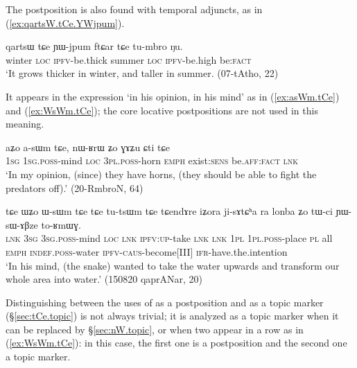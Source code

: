 The postposition  is also found with temporal adjuncts, as in (\ref{ex:qartsW.tCe.YWjpum}).

\begin{exe}
\ex \label{ex:qartsW.tCe.YWjpum}
\gll qartsɯ tɕe ɲɯ-jpum ftɕar tɕe tu-mbro ŋu. \\
winter \textsc{loc} \textsc{ipfv}-be.thick summer \textsc{loc} \textsc{ipfv}-be.high be:\textsc{fact} \\
\glt `It grows thicker in winter, and taller in summer. (07-tAtho, 22)
\end{exe}

It appears in the expression  `in his opinion, in his mind' as in (\ref{ex:asWm.tCe}) and (\ref{ex:WsWm.tCe}); the core locative postpositions are not used in this meaning.

\begin{exe}
\ex \label{ex:asWm.tCe}
\gll aʑo a-sɯm tɕe, nɯ-ʁrɯ ʑo ɣɤʑu ɕti tɕe \\
\textsc{1sg} \textsc{1sg}.\textsc{poss}-mind \textsc{loc} \textsc{3pl}.\textsc{poss}-horn \textsc{emph} exist:\textsc{sens} be.\textsc{aff}:\textsc{fact} \textsc{lnk} \\
\glt `In my opinion, (since) they have horns, (they should be able to fight the predators off).' (20-RmbroN, 64)
\end{exe}


\begin{exe}
\ex \label{ex:WsWm.tCe}
\gll tɕe ɯʑo ɯ-sɯm tɕe tɕe tu-tsɯm tɕe tɕendɤre iʑora ji-sɤtɕʰa ra lonba ʑo tɯ-ci ɲɯ-sɯ-ɤβze to-ʁmɯɣ. \\
\textsc{lnk} \textsc{3sg} \textsc{3sg}.\textsc{poss}-mind \textsc{loc} \textsc{lnk} \textsc{ipfv}:\textsc{up}-take \textsc{lnk} \textsc{lnk} \textsc{1pl} \textsc{1pl}.\textsc{poss}-place \textsc{pl} all \textsc{emph} \textsc{indef}.\textsc{poss}-water \textsc{ipfv}-\textsc{caus}-become[III] \textsc{ifr}-have.the.intention \\
\glt `In his mind, (the snake) wanted to take the water upwards and transform our whole area into water.' (150820 qaprANar, 20)
\end{exe} 

Distinguishing between the uses of  as a postposition and as a topic marker (§\ref{sec:tCe.topic}) is not always trivial; it is analyzed as a topic marker when it can be replaced by  §\ref{sec:nW.topic}, or when two  appear in a row as in (\ref{ex:WsWm.tCe}): in this case, the first one is a postposition and the second one a topic marker.


